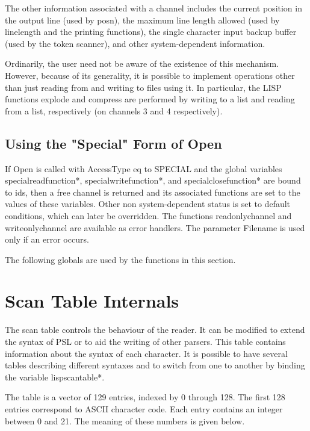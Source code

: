   The other information associated with a channel  includes  the
current  position in the output line (used by posn), the maximum
line  length  allowed  (used  by  linelength  and  the  printing
functions),  the  single  character input backup buffer (used by
the token scanner), and other system-dependent information.

  Ordinarily, the user need not be aware  of  the  existence  of
this  mechanism. However,  because  of  its generality, it is
possible to implement operations other than  just  reading  from
and  writing  to  files  using  it. In  particular,  the LISP
functions explode and compress are performed  by  writing  to  a
list  and reading from a list, respectively (on channels 3 and 4
respectively).

\subsection{Using the "Special" Form of Open}

  If Open is called with AccessType eq to SPECIAL and the global
variables   specialreadfunction*,   specialwritefunction*,   and
specialclosefunction*  are  bound to ids, then a free channel is
returned and its associated functions are set to the  values  of
these  variables.    Other non system-dependent status is set to
default  conditions,  which  can  later  be  overridden.     The
functions  readonlychannel and writeonlychannel are available as
error handlers.  The parameter Filename is used only if an error
occurs.

  The following globals  are  used  by  the  functions  in  this
section.


\section{Scan Table Internals}
		
The  scan  table controls the behaviour of the reader.  It can
be modified to extend the syntax of PSL or to aid the writing of
other parsers.  This table contains information about the syntax
of each character.   It  is  possible  to  have  several  tables
describing  different syntaxes and to switch from one to another
by binding the variable lispscantable*.

	The table is a vector of 129 entries,  indexed  by  0  through
128.   The first 128 entries correspond to ASCII character code.
Each entry contains an integer between 0 and 21. The meaning  of
these numbers is given below.

